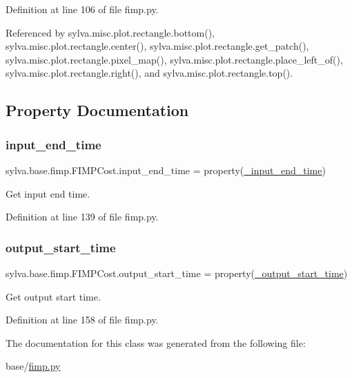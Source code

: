 Definition at line 106 of file fimp.\+py.



Referenced by sylva.\+misc.\+plot.\+rectangle.\+bottom(), sylva.\+misc.\+plot.\+rectangle.\+center(), sylva.\+misc.\+plot.\+rectangle.\+get\+\_\+patch(), sylva.\+misc.\+plot.\+rectangle.\+pixel\+\_\+map(), sylva.\+misc.\+plot.\+rectangle.\+place\+\_\+left\+\_\+of(), sylva.\+misc.\+plot.\+rectangle.\+right(), and sylva.\+misc.\+plot.\+rectangle.\+top().



\subsection{Property Documentation}
\mbox{\label{classsylva_1_1base_1_1fimp_1_1_f_i_m_p_cost_a0e6de19dbcfa3dee104fd7d469a148eb}} 
\subsubsection{\texorpdfstring{input\+\_\+end\+\_\+time}{input\_end\_time}}
{\footnotesize\ttfamily sylva.\+base.\+fimp.\+F\+I\+M\+P\+Cost.\+input\+\_\+end\+\_\+time = property(\hyperlink{classsylva_1_1base_1_1fimp_1_1_f_i_m_p_cost_ab5c4e28ac7b7fb3fd3e14a66a564e989}{\+\_\+input\+\_\+end\+\_\+time})\hspace{0.3cm}{\ttfamily [static]}}



Get input end time. 



Definition at line 139 of file fimp.\+py.

\mbox{\label{classsylva_1_1base_1_1fimp_1_1_f_i_m_p_cost_a2f755f827f18025c332335a16607f231}} 
\subsubsection{\texorpdfstring{output\+\_\+start\+\_\+time}{output\_start\_time}}
{\footnotesize\ttfamily sylva.\+base.\+fimp.\+F\+I\+M\+P\+Cost.\+output\+\_\+start\+\_\+time = property(\hyperlink{classsylva_1_1base_1_1fimp_1_1_f_i_m_p_cost_a162a87e8f45b84a27b8c7e2503539122}{\+\_\+output\+\_\+start\+\_\+time})\hspace{0.3cm}{\ttfamily [static]}}



Get output start time. 



Definition at line 158 of file fimp.\+py.



The documentation for this class was generated from the following file\+:\begin{DoxyCompactItemize}
\item 
base/\hyperlink{fimp_8py}{fimp.\+py}\end{DoxyCompactItemize}
